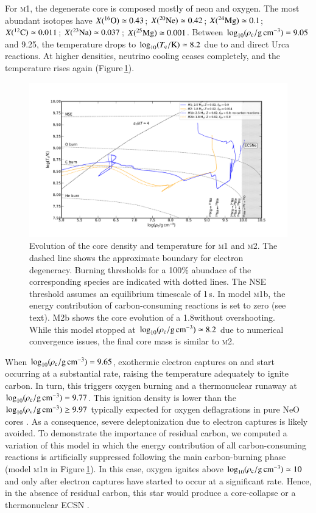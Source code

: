 \documentclass[twocolumn]{aa}
\begin{document}
For \textsc{m1}, the degenerate core is composed 
mostly of neon and oxygen. The most abundant isotopes have  $\abun{O}{16}\simeq 0.43$;  $\abun{Ne}{20}\simeq 0.42$; $\abun{Mg}{24}\simeq0.1$;  $\abun{C}{12}\simeq 0.011$; $\abun{Na}{23}\simeq 0.037$; $\abun{Mg}{25}\simeq 0.001$. Between $\logrhoc=9.05$ and 9.25, the temperature drops to $\logtc\simeq 8.2$ due to  and  direct Urca reactions. At higher densities, neutrino cooling ceases completely, and the temperature rises again (Figure\,\ref{fig:2}). 
\begin{figure}[htb!]
\begin{center}
\includegraphics[width=1.00\textwidth]{Rhoc_vs_Tc.pdf}
\caption{Evolution of the core density and temperature for \textsc{m1} and \textsc{m2}. The dashed line shows the approximate boundary for electron degeneracy. Burning thresholds for a 100\% abundace of the corresponding species are indicated with dotted lines. The NSE threshold assumes an equilibrium timescale of 1\,s.  In model \textsc{m1}b, the energy contribution of carbon-consuming reactions is set to zero (see text). \textsc{M2}b shows the core evolution of a 1.8\msun without overshooting. While this model stopped at $\logrhoc \simeq 8.2$ due to numerical convergence issues, the final core mass is similar to \textsc{m2}.}
\label{fig:2}
\end{center}
\end{figure}
When $\logrhoc=9.65$, exothermic electron captures on  and 
 start occurring at a substantial rate, raising the temperature 
adequately to ignite carbon. In turn, this triggers oxygen burning and a thermonuclear runaway at  $\logrhoc= 9.77$. This ignition density is  
lower than the   $\logrhoc\ge 9.97$ typically expected for oxygen deflagrations  in pure NeO cores \citep{Jones:2018ule}. As a consequence, 
severe deleptonization due to  electron captures is likely avoided.  To demonstrate the importance of residual carbon, we 
computed a variation of this model in which the energy contribution of all carbon-consuming reactions is artificially suppressed following the 
main carbon-burning phase (model \textsc{m1b} in Figure\,\ref{fig:2}). In this case, oxygen ignites above $\logrhoc\simeq 10$ and only after  electron captures have started to occur at a significant rate. Hence, in the absence of residual carbon, this star would produce a core-collapse or a thermonuclear ECSN \citep{Jones:2016asr}.
\end{document}
